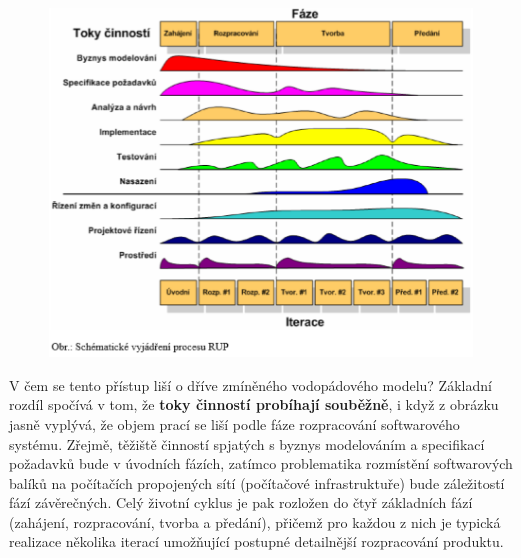 \begin{figure}[H]
\centering
\includegraphics[width=1\textwidth]{assets/rup.png}
\end{figure}

V čem se tento přístup liší o dříve zmíněného vodopádového modelu?  Základní rozdíl spočívá v tom, že \textbf{toky činností probíhají souběžně}, i když z obrázku jasně vyplývá, že objem prací se liší podle fáze rozpracování softwarového systému.  Zřejmě, těžiště činností spjatých s byznys modelováním a specifikací požadavků bude v úvodních fázích, zatímco problematika rozmístění softwarových balíků na počítačích propojených sítí (počítačové infrastruktuře) bude záležitostí fází závěrečných.  Celý životní cyklus je pak rozložen do čtyř základních fází (zahájení, rozpracování, tvorba a předání), přičemž pro každou z nich je typická realizace několika iterací umožňující postupné detailnější rozpracování produktu.


